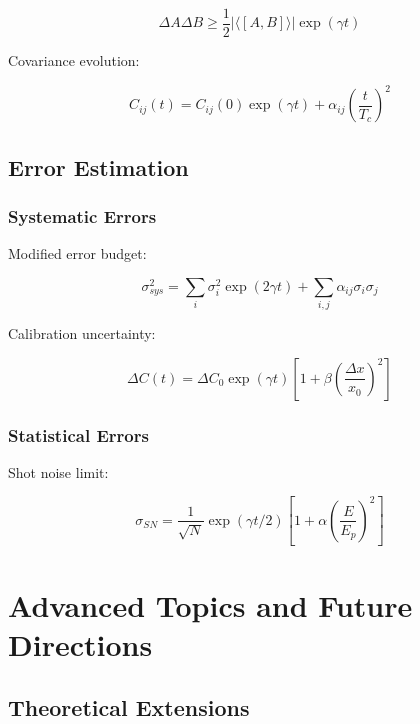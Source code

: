 \documentclass[12pt]{article}
\theoremstyle{plain}
\theoremstyle{definition}
\theoremstyle{remark}
\begin{document}
\begin{equation}
\Delta A\Delta B \geq \frac{1}{2}|\langle[A,B]\rangle|\exp(\gamma t)
\end{equation}

Covariance evolution:

\begin{equation}
C_{ij}(t) = C_{ij}(0)\exp(\gamma t) + \alpha_{ij}\left(\frac{t}{T_c}\right)^2
\end{equation}

\subsection{Error Estimation}

\subsubsection{Systematic Errors}

Modified error budget:

\begin{equation}
\sigma_{sys}^2 = \sum_i \sigma_i^2\exp(2\gamma t) + \sum_{i,j}\alpha_{ij}\sigma_i\sigma_j
\end{equation}

Calibration uncertainty:

\begin{equation}
\Delta C(t) = \Delta C_0\exp(\gamma t)\left[1 + \beta\left(\frac{\Delta x}{x_0}\right)^2\right]
\end{equation}

\subsubsection{Statistical Errors}

Shot noise limit:

\begin{equation}
\sigma_{SN} = \frac{1}{\sqrt{N}}\exp(\gamma t/2)\left[1 + \alpha\left(\frac{E}{E_p}\right)^2\right]
\end{equation}

\section{Advanced Topics and Future Directions}

\subsection{Theoretical Extensions}
\end{document}
